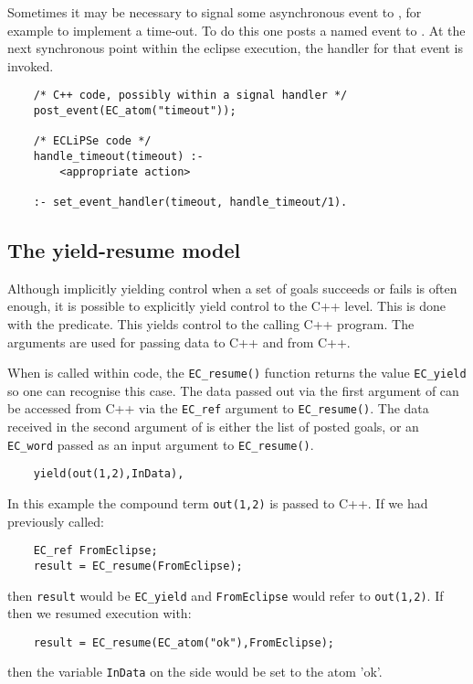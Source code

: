 Sometimes it may be necessary to signal some asynchronous event to
{\eclipse}, for example to implement a time-out. To do this one
posts a named event to {\eclipse}. At the next synchronous point
within the eclipse execution, the handler for that event is
invoked.
\begin{verbatim}
    /* C++ code, possibly within a signal handler */
    post_event(EC_atom("timeout"));

    /* ECLiPSe code */
    handle_timeout(timeout) :-
        <appropriate action>

    :- set_event_handler(timeout, handle_timeout/1).
\end{verbatim}


\subsection{The yield-resume model}

Although implicitly yielding control when a set of goals succeeds
or fails is often enough, it is possible to explicitly yield
control to the C++ level. This is done with the
predicate.  This yields control to the calling C++ program.
The arguments are used for passing data to C++ and from C++.

When  is called within {\eclipse} code, the \verb.EC_resume().
function returns the value \verb.EC_yield. so one can recognise this case.
The data passed out via the first argument of 
can  be accessed from C++ via the \verb.EC_ref. argument to \verb.EC_resume()..
The data received in the second argument of  is either
the list of posted goals, or an \verb.EC_word. passed as an input
argument to \verb.EC_resume()..

\begin{verbatim}
    yield(out(1,2),InData),
\end{verbatim}

In this example the compound term \verb.out(1,2). is passed to C++.
If we had previously called:
\begin{verbatim}
    EC_ref FromEclipse;
    result = EC_resume(FromEclipse);
\end{verbatim}
then \verb.result. would be \verb.EC_yield. and \verb.FromEclipse. would
refer to \verb.out(1,2).. If then we resumed execution with:
\begin{verbatim}
    result = EC_resume(EC_atom("ok"),FromEclipse);
\end{verbatim}
then the variable \verb.InData. on the {\eclipse} side
would be set to the atom 'ok'.


